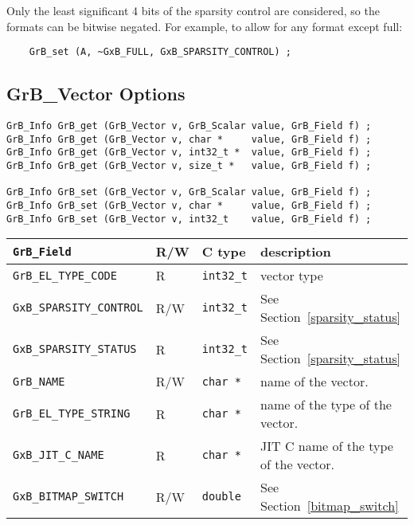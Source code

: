 Only the least significant 4 bits of the sparsity control are considered, so
the formats can be bitwise negated.  For example, to allow for any format
except full:

{\footnotesize
\begin{verbatim}
    GrB_set (A, ~GxB_FULL, GxB_SPARSITY_CONTROL) ; \end{verbatim}}

\newpage
\subsection{{\sf GrB\_Vector} Options}
\label{get_set_vector}

\begin{mdframed}[userdefinedwidth=6in]
{\footnotesize
\begin{verbatim}
GrB_Info GrB_get (GrB_Vector v, GrB_Scalar value, GrB_Field f) ;
GrB_Info GrB_get (GrB_Vector v, char *     value, GrB_Field f) ;
GrB_Info GrB_get (GrB_Vector v, int32_t *  value, GrB_Field f) ;
GrB_Info GrB_get (GrB_Vector v, size_t *   value, GrB_Field f) ;

GrB_Info GrB_set (GrB_Vector v, GrB_Scalar value, GrB_Field f) ;
GrB_Info GrB_set (GrB_Vector v, char *     value, GrB_Field f) ;
GrB_Info GrB_set (GrB_Vector v, int32_t    value, GrB_Field f) ;
\end{verbatim}
}\end{mdframed}

\noindent
{\small
\begin{tabular}{|l|l|l|p{3in}|}
\hline
\verb'GrB_Field'                    & R/W  & C type        & description \\
\hline
\verb'GrB_EL_TYPE_CODE'             & R    & \verb'int32_t'& vector type \\
\verb'GxB_SPARSITY_CONTROL'         & R/W  & \verb'int32_t'& See Section~\ref{sparsity_status} \\
\verb'GxB_SPARSITY_STATUS'          & R    & \verb'int32_t'& See Section~\ref{sparsity_status} \\
\hline
\verb'GrB_NAME'                     & R/W  & \verb'char *' & name of the vector. \\
\verb'GrB_EL_TYPE_STRING'           & R    & \verb'char *' & name of the type of the vector. \\
\verb'GxB_JIT_C_NAME'               & R    & \verb'char *' & JIT C name of the type of the vector. \\
\hline
\verb'GxB_BITMAP_SWITCH'            & R/W  & \verb'double' & See Section~\ref{bitmap_switch} \\
\hline
\end{tabular}
}

